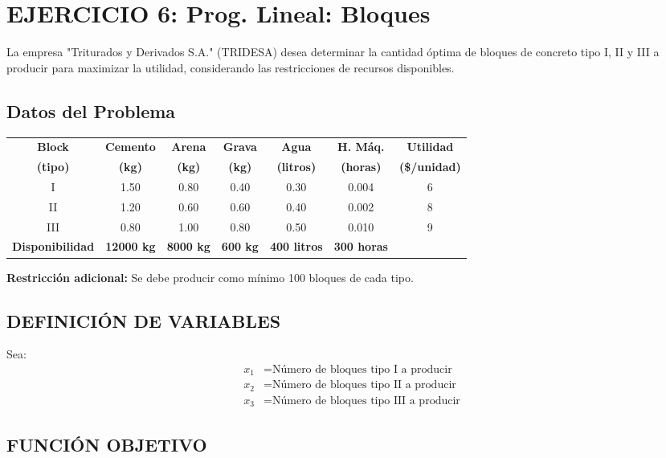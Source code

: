 \documentclass[12pt, a4paper, oneside]{book}
\theoremstyle{definition}
\begin{document}
\newpage
\section{EJERCICIO 6: Prog. Lineal: Bloques}

La empresa "Triturados y Derivados S.A." (TRIDESA) desea determinar la cantidad óptima de bloques de concreto tipo I, II y III a producir para maximizar la utilidad, considerando las restricciones de recursos disponibles.

\subsection{Datos del Problema}

\begin{table}[h]
\centering
\begin{tabular}{|c|c|c|c|c|c|c|}
\hline
\textbf{Block} & \textbf{Cemento} & \textbf{Arena} & \textbf{Grava} & \textbf{Agua} & \textbf{H. Máq.} & \textbf{Utilidad} \\
\textbf{(tipo)} & \textbf{(kg)} & \textbf{(kg)} & \textbf{(kg)} & \textbf{(litros)} & \textbf{(horas)} & \textbf{(\$/unidad)} \\
\hline
I & 1.50 & 0.80 & 0.40 & 0.30 & 0.004 & 6 \\
II & 1.20 & 0.60 & 0.60 & 0.40 & 0.002 & 8 \\
III & 0.80 & 1.00 & 0.80 & 0.50 & 0.010 & 9 \\
\hline
\textbf{Disponibilidad} & \textbf{12000 kg} & \textbf{8000 kg} & \textbf{600 kg} & \textbf{400 litros} & \textbf{300 horas} & \\
\hline
\end{tabular}
\end{table}

\textbf{Restricción adicional:} Se debe producir como mínimo 100 bloques de cada tipo.

\subsection{DEFINICIÓN DE VARIABLES}

Sea:
\begin{align}
x_1 &= \text{Número de bloques tipo I a producir} \\
x_2 &= \text{Número de bloques tipo II a producir} \\
x_3 &= \text{Número de bloques tipo III a producir}
\end{align}

\subsection{FUNCIÓN OBJETIVO}
\end{document}
